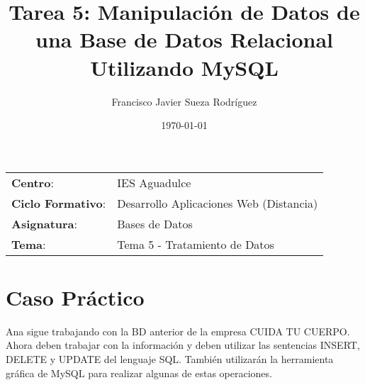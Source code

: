 


\title{
\vspace{10ex}
\normalfont \normalsize
\Huge \textbf{Tarea 5: Manipulación de Datos de una Base de Datos Relacional Utilizando MySQL}
}
\author{Francisco Javier Sueza Rodríguez}
\date{\normalsize\today}



\maketitle

\thispagestyle{empty}

\vspace{62ex}

\begin{center}
    \begin{tabular}{l l}
        \textbf{Centro}: & IES Aguadulce \\
        \textbf{Ciclo Formativo}: & Desarrollo Aplicaciones Web (Distancia)\\
        \textbf{Asignatura}: & Bases de Datos\\
        \textbf{Tema}: & Tema 5 - Tratamiento de Datos\\
    \end{tabular}
\end{center}

\newpage

\tableofcontents

\newpage

\listoffigures

\newpage

\section{Caso Práctico}

Ana sigue trabajando con la BD anterior de la empresa CUIDA TU CUERPO. Ahora deben trabajar con la información y deben utilizar las sentencias INSERT, DELETE y UPDATE del lenguaje SQL. También utilizarán la herramienta gráfica de MySQL para realizar algunas de estas operaciones.

